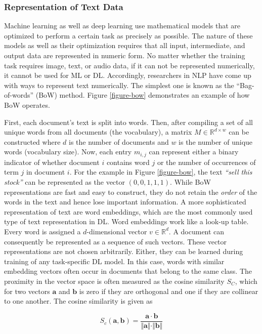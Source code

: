 \subsubsection{Representation of Text Data}
Machine learning as well as deep learning use mathematical models that are optimized to perform a certain task as precisely as possible. The nature of these models as well as their optimization requires that all input, intermediate, and output data are represented in numeric form. No matter whether the training task requires image, text, or audio data, if it can not be represented numerically, it cannot be used for ML or DL. Accordingly, researchers in NLP have come up with ways to represent text numerically. The simplest one is known as the ``Bag-of-words'' (BoW) method. Figure \ref{figure-bow} demonstrates an example of how BoW operates.



 First, each document's text is split into words. Then, after compiling a set of all unique words from all documents (the vocabulary), a matrix $M \in \mathbb{R}^{d \times w}$ can be constructed where $d$ is the number of documents and $w$ is the number of unique words (vocabulary size). Now, each entry $m_{i,j}$ can represent either a binary indicator of whether document $i$ contains word $j$ or the number of occurrences of term $j$ in document $i$. For the example in Figure \ref{figure-bow}, the text \emph{``sell this stock''} can be represented as the vector $(0,0,1,1,1)$. While BoW representations are fast and easy to construct, they do not retain the \emph{order} of the words in the text and hence lose important information. A more sophisticated representation of text are word embeddings, which are the most commonly used type of text representation in DL. Word embeddings work like a look-up table. Every word is assigned a $d$-dimensional vector $v \in \mathbb{R}^{d}$. A document can consequently be represented as a sequence of such vectors. These vector representations are not chosen arbitrarily. Either, they can be learned during training of any task-specific DL model. In this case, words with similar embedding vectors often occur in documents that belong to the same class. The proximity in the vector space is often measured as the cosine similarity $S_C$, which for two vectors $\bm{a}$ and $\bm{b}$ is zero if they are orthogonal and one if they are collinear to one another. The cosine similarity is given as

\begin{equation}
	S_c(\bm{a}, \bm{b}) = \frac{\bm{a} \cdot \bm{b}}{\Vert \bm{a} \Vert \cdot \Vert \bm{b} \Vert}
\end{equation} 

